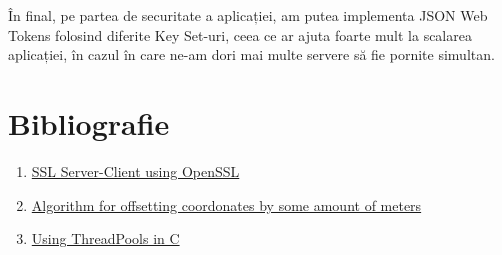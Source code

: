 \documentclass{article}
\begin{document}
În final, pe partea de securitate a aplicației, am putea implementa JSON Web Tokens folosind diferite Key Set-uri, ceea ce ar ajuta foarte mult la scalarea aplicației, în cazul în care ne-am dori mai multe servere să fie pornite simultan.
\section{Bibliografie}
\begin{enumerate}
    \item   \href{https://aticleworld.com/ssl-server-client-using-openssl-in-c/}{SSL Server-Client using OpenSSL}
    \item   \href{https://gis.stackexchange.com/questions/2951/algorithm-for-offsetting-a-latitude-longitude-by-some-amount-of-meters}{Algorithm for offsetting coordonates by some amount of meters}
    \item   \href{https://nachtimwald.com/2019/04/12/thread-pool-in-c/}{Using ThreadPools in C}
\end{enumerate}
\end{document}
